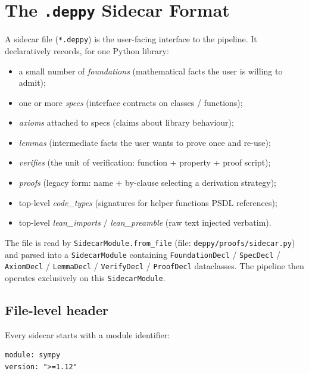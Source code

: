 \chapter{The \texttt{.deppy} Sidecar Format}
\label{ch:deppy}

A sidecar file (\texttt{*.deppy}) is the user-facing interface to
the \Deppy{} pipeline.  It declaratively records, for one Python
library:

\begin{itemize}[leftmargin=1.7em]
  \item a small number of \emph{foundations} (mathematical facts the
    user is willing to admit);
  \item one or more \emph{specs} (interface contracts on classes /
    functions);
  \item \emph{axioms} attached to specs (claims about library
    behaviour);
  \item \emph{lemmas} (intermediate facts the user wants to prove
    once and re-use);
  \item \emph{verifies} (the unit of verification: function +
    property + proof script);
  \item \emph{proofs} (legacy form: name + by-clause selecting a
    derivation strategy);
  \item top-level \emph{code\_types} (signatures for helper
    functions PSDL references);
  \item top-level \emph{lean\_imports} / \emph{lean\_preamble} (raw
    \Lean{} text injected verbatim).
\end{itemize}

The file is read by \texttt{SidecarModule.from\_file} (file:
\texttt{deppy/proofs/sidecar.py}) and parsed into a
\texttt{SidecarModule} containing
\texttt{FoundationDecl} / \texttt{SpecDecl} / \texttt{AxiomDecl} /
\texttt{LemmaDecl} / \texttt{VerifyDecl} / \texttt{ProofDecl}
dataclasses.  The pipeline then operates exclusively on this
\texttt{SidecarModule}.

\section{File-level header}

Every sidecar starts with a module identifier:

\begin{lstlisting}[language=deppyfile,caption={Header of \texttt{sympy\_geometry.deppy}.}]
module: sympy
version: ">=1.12"
\end{lstlisting}

